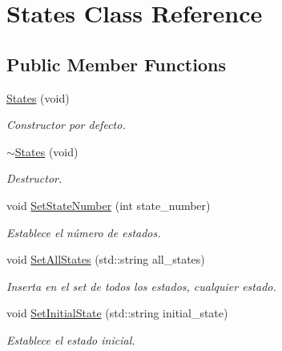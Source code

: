 \hypertarget{classStates}{}\section{States Class Reference}
\label{classStates}
\subsection*{Public Member Functions}
\begin{DoxyCompactItemize}
\item 
\hyperlink{classStates_a8cf0b9ef14edb0704c74ac62ea338eab}{States} (void)
\begin{DoxyCompactList}\small\item\em Constructor por defecto. \end{DoxyCompactList}\item 
\mbox{\label{classStates_a7b937978429b4c240ec3ba50dc5b0ab5}} 
\hyperlink{classStates_a7b937978429b4c240ec3ba50dc5b0ab5}{$\sim$\+States} (void)
\begin{DoxyCompactList}\small\item\em Destructor. \end{DoxyCompactList}\item 
\mbox{\label{classStates_a5a2bc9b7cc865d41d22d46f3171942c8}} 
void \hyperlink{classStates_a5a2bc9b7cc865d41d22d46f3171942c8}{Set\+State\+Number} (int state\+\_\+number)
\begin{DoxyCompactList}\small\item\em Establece el número de estados. \end{DoxyCompactList}\item 
\mbox{\label{classStates_ac84bd2eaecd487ec1ec5f935810262bd}} 
void \hyperlink{classStates_ac84bd2eaecd487ec1ec5f935810262bd}{Set\+All\+States} (std\+::string all\+\_\+states)
\begin{DoxyCompactList}\small\item\em Inserta en el set de todos los estados, cualquier estado. \end{DoxyCompactList}\item 
\mbox{\label{classStates_a5a59b1d5e57a4a77053521c180259328}} 
void \hyperlink{classStates_a5a59b1d5e57a4a77053521c180259328}{Set\+Initial\+State} (std\+::string initial\+\_\+state)
\begin{DoxyCompactList}\small\item\em Establece el estado inicial. \end{DoxyCompactList}\item 

\end{DoxyCompactItemize}
